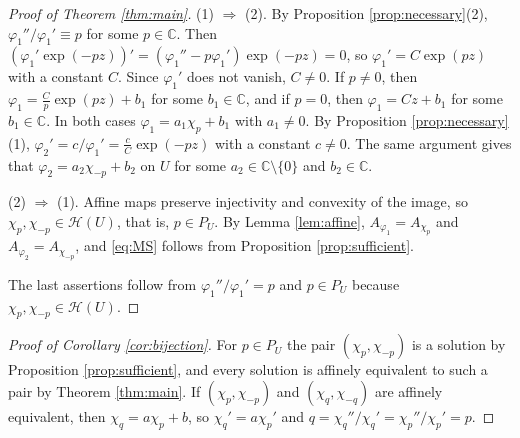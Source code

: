 \documentclass[a4paper, reqno, 11pt]{amsart}
\theoremstyle{definition}
\begin{document}
\begin{proof}[Proof of Theorem \ref{thm:main}]
(1) $\Rightarrow$ (2).
By Proposition \ref{prop:necessary}(2), $\varphi_1''/\varphi_1' \equiv p$ for some $p \in \mathbb{C}$.
Then $\left(\varphi_1' \exp(-pz)\right)' = (\varphi_1'' - p\varphi_1') \exp(-pz) = 0$, so $\varphi_1' = C \exp(pz)$ with a constant $C$.
Since $\varphi_1'$ does not vanish, $C \ne 0$. 
If $p \ne 0$, then $\varphi_1 = \frac{C}{p} \exp(pz) + b_1$ for some $b_1 \in \mathbb{C}$, and if $p = 0$, then $\varphi_1 = Cz + b_1$ for some $b_1 \in \mathbb{C}$.
In both cases $\varphi_1 = a_1 \chi_p + b_1$ with $a_1 \ne 0$.
By Proposition \ref{prop:necessary}(1), 
$\varphi_2' = c/\varphi_1' = \frac{c}{C} \exp(-pz)$ with a constant $c \ne 0$.  
The same argument gives that $\varphi_2 = a_2\chi_{-p}+b_2$ on $U$ for some $a_2\in \mathbb{C} \setminus\{0\}$ and $b_2 \in \mathbb C$.

(2) $\Rightarrow$ (1).
Affine maps preserve injectivity and convexity of the image, so $\chi_p, \chi_{-p} \in \mathcal{H}(U)$, that is, $p \in P_U$.
By Lemma \ref{lem:affine}, $A_{\varphi_1} = A_{\chi_p}$ and $A_{\varphi_2} = A_{\chi_{-p}}$, and \eqref{eq:MS} follows from Proposition \ref{prop:sufficient}.

The last assertions follow from $\varphi_1''/\varphi_1' = p$ and $p\in P_U$ because $\chi_p, \chi_{-p}\in \mathcal{H}(U)$.
\end{proof}

\begin{proof}[Proof of Corollary \ref{cor:bijection}]
For $p \in P_U$ the pair $(\chi_p, \chi_{-p})$ is a solution by Proposition \ref{prop:sufficient}, and every solution is affinely equivalent to such a pair by Theorem \ref{thm:main}.
If $(\chi_p, \chi_{-p})$ and $(\chi_q, \chi_{-q})$ are affinely equivalent, then $\chi_q = a\chi_p + b$, so $\chi_q' = a\chi_p'$ and $q = \chi_q''/\chi_q' = \chi_p''/\chi_p' = p$.
\end{proof}
\end{document}
